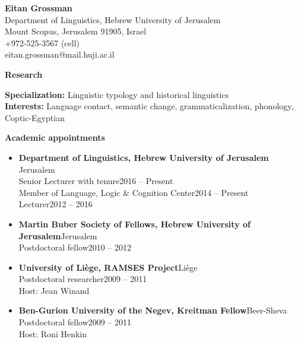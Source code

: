 \documentclass[letterpaper,11pt]{article}
\newcommand{\resheading}[1]{
\vspace*{6pt}
{\large \colorbox{mygrey}{\begin{minipage}{\textwidth}{\textbf{#1 \vphantom{p\^{E}}}}\end{minipage}}}
}
\begin{document}
\begin{center}
\textbf{\Large Eitan Grossman}%
\\{Department of Linguistics, Hebrew University of Jerusalem}\\
{Mount Scopus, Jerusalem 91905, Israel}\\
{+972-525-3567 (cell)}\hspace{3mm}{+972-2-588-1610 (work)}\\
eitan.grossman@mail.huji.ac.il\\
\end{center}
\vspace*{6pt}
\resheading{Research}
\centering
\begin{minipage}{6.75in}
	\vspace*{6pt}
	\vspace*{4pt}
	\raggedright
	\textbf {Specialization:} Linguistic typology and historical linguistics\\[4pt]
	\textbf{Interests:} Language contact, semantic change, grammaticalization, phonology, Coptic-Egyptian	
\end{minipage}
\vspace{4pt}
\resheading{Academic appointments} 
\begin{itemize}
\vspace{-0.025 in}
\vspace*{-2pt}
\item
\textbf {{Department of Linguistics, Hebrew University of Jerusalem} }\hfill{Jerusalem}\\
{Senior Lecturer with tenure}\hfill{2016 -- Present}\\
{Member of Language, Logic \& Cognition Center}\hfill{2014 -- Present}\\
{Lecturer}\hfill{2012 -- 2016}\\
\item \textbf{{Martin Buber Society of Fellows, Hebrew University of Jerusalem}}\hfill{Jerusalem}\\{Postdoctoral fellow}\hfill{2010 -- 2012}\\
\item \textbf{University of Li\`{e}ge, RAMSES Project}\hfill{Li\`{e}ge}\\{ Postdoctoral researcher}\hfill{2009 -- 2011}\\Host: Jean Winand
\item \textbf{Ben-Gurion University of the Negev, Kreitman Fellow}\hfill{Beer-Sheva}\\{Postdoctoral fellow}\hfill{2009 -- 2011}\\Host: Roni Henkin
\end{itemize}
\end{document}
